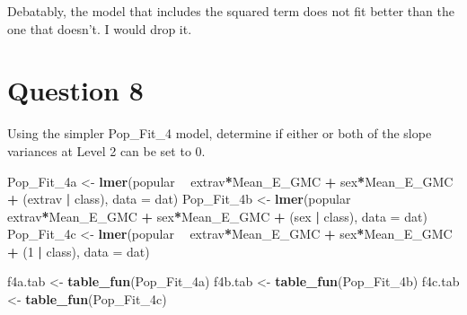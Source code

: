\documentclass[]{article}
\newenvironment{Shaded}{\begin{snugshade}}{\end{snugshade}}
\newcommand{\KeywordTok}[1]{\textcolor[rgb]{0.13,0.29,0.53}{\textbf{#1}}}
\newcommand{\DataTypeTok}[1]{\textcolor[rgb]{0.13,0.29,0.53}{#1}}
\newcommand{\DecValTok}[1]{\textcolor[rgb]{0.00,0.00,0.81}{#1}}
\newcommand{\StringTok}[1]{\textcolor[rgb]{0.31,0.60,0.02}{#1}}
\newcommand{\OperatorTok}[1]{\textcolor[rgb]{0.81,0.36,0.00}{\textbf{#1}}}
\newcommand{\NormalTok}[1]{#1}
\begin{document}
Debatably, the model that includes the squared term does not fit better
than the one that doesn't. I would drop it.

\section{Question 8}\label{question-8}

Using the simpler Pop\_Fit\_4 model, determine if either or both of the
slope variances at Level 2 can be set to 0.

\begin{Shaded}
\begin{Highlighting}[]
\NormalTok{Pop_Fit_4a <-}\StringTok{ }\KeywordTok{lmer}\NormalTok{(popular }\OperatorTok{~}\StringTok{ }\NormalTok{extrav}\OperatorTok{*}\NormalTok{Mean_E_GMC }\OperatorTok{+}\StringTok{ }\NormalTok{sex}\OperatorTok{*}\NormalTok{Mean_E_GMC }\OperatorTok{+}\StringTok{ }\NormalTok{(extrav }\OperatorTok{|}\StringTok{ }\NormalTok{class), }\DataTypeTok{data =}\NormalTok{ dat)}
\NormalTok{Pop_Fit_4b <-}\StringTok{ }\KeywordTok{lmer}\NormalTok{(popular }\OperatorTok{~}\StringTok{ }\NormalTok{extrav}\OperatorTok{*}\NormalTok{Mean_E_GMC }\OperatorTok{+}\StringTok{ }\NormalTok{sex}\OperatorTok{*}\NormalTok{Mean_E_GMC }\OperatorTok{+}\StringTok{ }\NormalTok{(sex }\OperatorTok{|}\StringTok{ }\NormalTok{class), }\DataTypeTok{data =}\NormalTok{ dat)}
\NormalTok{Pop_Fit_4c <-}\StringTok{ }\KeywordTok{lmer}\NormalTok{(popular }\OperatorTok{~}\StringTok{ }\NormalTok{extrav}\OperatorTok{*}\NormalTok{Mean_E_GMC }\OperatorTok{+}\StringTok{ }\NormalTok{sex}\OperatorTok{*}\NormalTok{Mean_E_GMC }\OperatorTok{+}\StringTok{ }\NormalTok{(}\DecValTok{1} \OperatorTok{|}\StringTok{ }\NormalTok{class), }\DataTypeTok{data =}\NormalTok{ dat)}

\NormalTok{f4a.tab <-}\StringTok{ }\KeywordTok{table_fun}\NormalTok{(Pop_Fit_4a)}
\NormalTok{f4b.tab <-}\StringTok{ }\KeywordTok{table_fun}\NormalTok{(Pop_Fit_4b)}
\NormalTok{f4c.tab <-}\StringTok{ }\KeywordTok{table_fun}\NormalTok{(Pop_Fit_4c)}


\end{Highlighting}
\end{Shaded}
\end{document}
